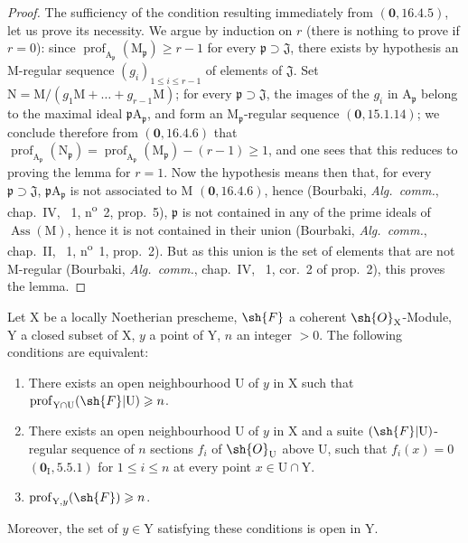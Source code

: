 \begin{proof}
The sufficiency of the condition resulting immediately from $(\mathbf{0},16.4.5)$, let us prove its necessity. We argue by induction on $r$ (there is nothing to prove if $r=0$): since $\operatorname{prof}_{\mathrm{A}_\mathfrak{p}}(\mathrm{M}_\mathfrak{p})\geqslant r-1$ for every $\mathfrak{p}\supset\mathfrak{J}$, there exists by hypothesis an M-regular sequence $(g_i)_{1\leqslant i\leqslant r-1}$ of elements of $\mathfrak{J}$. Set $\mathrm{N}=\mathrm{M}/(g_1\mathrm{M}+\ldots+g_{r-1}\mathrm{M})$; for every $\mathfrak{p}\supset\mathfrak{J}$, the images of the $g_i$ in $\mathrm{A}_\mathfrak{p}$ belong to the maximal ideal $\mathfrak{p}\mathrm{A}_\mathfrak{p}$, and form an $\mathrm{M}_\mathfrak{p}$-regular sequence $(\mathbf{0},15.1.14)$; we conclude therefore from $(\mathbf{0},16.4.6)$ that $\operatorname{prof}_{\mathrm{A}_\mathfrak{p}}(\mathrm{N}_\mathfrak{p})=\operatorname{prof}_{\mathrm{A}_\mathfrak{p}}(\mathrm{M}_\mathfrak{p})-(r-1)\geqslant 1$, and one sees that this reduces to proving the lemma for $r=1$. Now the hypothesis means then that, for every $\mathfrak{p}\supset\mathfrak{J}$, $\mathfrak{p}\mathrm{A}_\mathfrak{p}$ is not associated to $\mathrm{M}$ $(\mathbf{0},16.4.6)$, hence (Bourbaki, \emph{Alg.~comm.}, chap.~IV, \textsection~1, n\textsuperscript{o}~2, prop.~5), $\mathfrak{p}$ is not contained in any of the prime ideals of $\operatorname{Ass}(\mathrm{M})$, hence it is not contained in their union (Bourbaki, \emph{Alg.~comm.}, chap.~II, \textsection~1, n\textsuperscript{o}~1, prop.~2). But as this union is the set of elements that are not M-regular (Bourbaki, \emph{Alg.~comm.}, chap.~IV, \textsection~1, cor.~2 of prop.~2), this proves the lemma.
\end{proof}

\begin{proposition}[19.9.3]
\label{IV.19.9.3}
Let $\mathrm{X}$ be a locally Noetherian prescheme, $\sh{F}$ a coherent $\sh{O}_\mathrm{X}$-Module, $\mathrm{Y}$ a closed subset of $\mathrm{X}$, $y$ a point of $\mathrm{Y}$, $n$ an integer $>0$. The following conditions are equivalent:
\begin{enumerate}
\item[\rm a)] There exists an open neighbourhood $\mathrm{U}$ of $y$ in $\mathrm{X}$ such that $\operatorname{prof}_{\mathrm{Y}\cap\mathrm{U}}(\sh{F}|\mathrm{U})\geqslant n$.
\item[\rm b)] There exists an open neighbourhood $\mathrm{U}$ of $y$ in $\mathrm{X}$ and a suite $(\sh{F}|\mathrm{U})$-regular sequence of $n$ sections $f_i$ of $\sh{O}_\mathrm{U}$ above $\mathrm{U}$, such that $f_i(x)=0$ $(\mathbf{0}_\mathrm{I},5.5.1)$ for $1\leqslant i\leqslant n$ at every point $x\in\mathrm{U}\cap\mathrm{Y}$.
\item[\rm c)] $\operatorname{prof}_{\mathrm{Y},y}(\sh{F})\geqslant n$.
\end{enumerate}

Moreover, the set of $y\in\mathrm{Y}$ satisfying these conditions is open in $\mathrm{Y}$.
\end{proposition}

